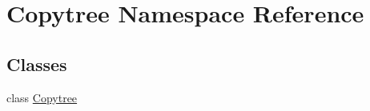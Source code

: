 \hypertarget{namespace_copytree}{\section{Copytree Namespace Reference}
\label{namespace_copytree}
}
\subsection*{Classes}
\begin{DoxyCompactItemize}
\item 
class \hyperlink{class_copytree_1_1_copytree}{Copytree}
\end{DoxyCompactItemize}
